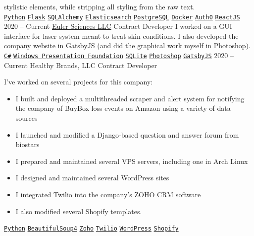 \documentclass[9pt]{developercv} %
\begin{document}
\begin{entrylist}
{            stylistic elements, while stripping all styling from the raw text.
        \\
        \texttt{{\href{https://www.python.org/}{Python}}}\slashsep
        \texttt{{\href{https://flask.palletsprojects.com/en/1.1.x/}{Flask}}}\slashsep
        \texttt{{\href{https://www.sqlalchemy.org/}{SQLAlchemy}}}\slashsep
        \texttt{{\href{https://www.elastic.co/}{Elasticsearch}}}\slashsep
        \texttt{{\href{https://www.postgresql.org/}{PostgreSQL}}}\slashsep
        \texttt{{\href{https://www.docker.com/}{Docker}}}\slashsep
        \texttt{{\href{https://auth0.com/}{Auth0}}}\slashsep
        \texttt{{\href{https://reactjs.org/}{ReactJS}}}
        }
    \entry
        {2020 -- Current}
        {\href{https://euler-sci.com}{Euler Sciences LLC}}
        {Contract Developer}
        {
            I worked on a GUI interface for laser system meant to treat skin
            conditions. I also developed the company website in GatsbyJS (and
            did the graphical work myself in Photoshop).
        \\
        \texttt{{\href{https://en.wikipedia.org/wiki/C_Sharp_(programming_language)}{C\#}}}\slashsep
        \texttt{{\href{https://en.wikipedia.org/wiki/Windows_Presentation_Foundation}{Windows Presentation Foundation}}}\slashsep
        \texttt{{\href{https://www.sqlite.org/index.html}{SQLite}}}\slashsep
        \texttt{{\href{https://www.adobe.com/products/photoshop.html}{Photoshop}}}\slashsep
        \texttt{{\href{https://www.gatsbyjs.org/}{GatsbyJS}}}
        }
    \entry
        {2020 -- Current}
        {Healthy Brands, LLC}
        {Contract Developer}
        {
            I've worked on several projects for this company:
            \begin{itemize}[leftmargin=*, noitemsep]
                \item I built and deployed a multithreaded scraper and alert system for notifying the company of BuyBox loss events on Amazon using a variety of data sources
                \item I launched and modified a Django-based question and answer forum from biostars
                \item I prepared and maintained several VPS servers, including one in Arch Linux
                \item I designed and maintained several WordPress sites
                \item I integrated Twilio into the company's ZOHO CRM software
                \item I also modified several Shopify templates.
            \end{itemize}
        \texttt{{\href{https://www.python.org/}{Python}}}\slashsep
        \texttt{{\href{https://www.crummy.com/software/BeautifulSoup/bs4/doc/}{BeautifulSoup4}}}\slashsep
        \texttt{{\href{https://www.zoho.com/}{Zoho}}}\slashsep
        \texttt{{\href{https://www.twilio.com/}{Twilio}}}\slashsep
        \texttt{{\href{https://wordpress.org/}{WordPress}}}\slashsep
        \texttt{{\href{https://www.shopify.com/}{Shopify}}}
        }
\end{entrylist}
\end{document}
